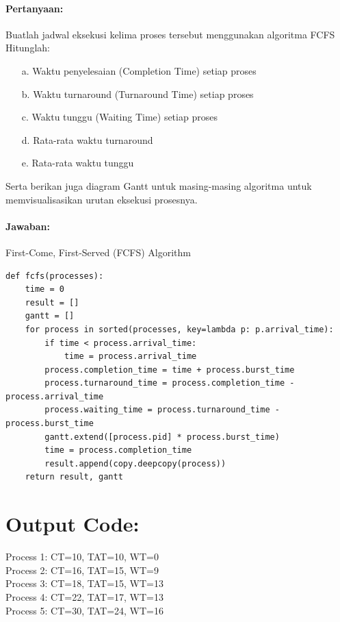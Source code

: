 \documentclass[12pt]{article}
\begin{document}
\paragraph{Pertanyaan:} Buatlah jadwal eksekusi kelima proses tersebut menggunakan algoritma FCFS Hitunglah:
   \begin{itemize}
      \item[a.] Waktu penyelesaian (Completion Time) setiap proses
      \item[b.] Waktu turnaround (Turnaround Time) setiap proses
      \item[c.] Waktu tunggu (Waiting Time) setiap proses
      \item[d.] Rata-rata waktu turnaround
      \item[e.] Rata-rata waktu tunggu
   \end{itemize}

Serta berikan juga diagram Gantt untuk masing-masing algoritma untuk memvisualisasikan urutan eksekusi prosesnya.

\paragraph{Jawaban:} 

First-Come, First-Served (FCFS) Algorithm

\begin{lstlisting}[]
def fcfs(processes):
    time = 0
    result = []
    gantt = []
    for process in sorted(processes, key=lambda p: p.arrival_time):
        if time < process.arrival_time:
            time = process.arrival_time
        process.completion_time = time + process.burst_time
        process.turnaround_time = process.completion_time - process.arrival_time
        process.waiting_time = process.turnaround_time - process.burst_time
        gantt.extend([process.pid] * process.burst_time)
        time = process.completion_time
        result.append(copy.deepcopy(process))
    return result, gantt
\end{lstlisting}



\section*{Output Code:}

Process 1: CT=10, TAT=10, WT=0 \\
Process 2: CT=16, TAT=15, WT=9 \\
Process 3: CT=18, TAT=15, WT=13 \\
Process 4: CT=22, TAT=17, WT=13 \\
Process 5: CT=30, TAT=24, WT=16 \\
\end{document}
